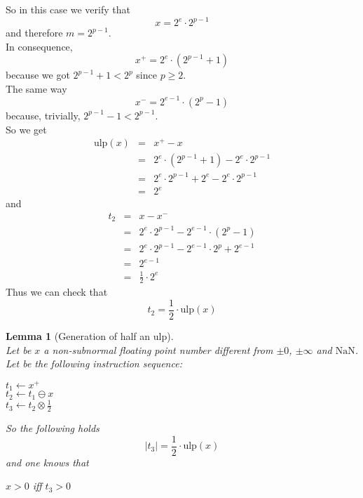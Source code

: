 \documentclass[a4paper,10pt,twoside]{article}
\newtheorem{lemma}[theorem]{Lemma}
\newenvironment{proof}[1][Proof]{\begin{trivlist}
\item[\hskip \labelsep {\bfseries #1}]}{\end{trivlist}}
\newcommand{\qed}{\nobreak \ifvmode \relax \else \ifdim \lastskip<1.5em \hskip-\lastskip
\hskip1.5em plus0em minus0.5em \fi \nobreak \vrule height0.75em width0.5em depth0.25em\fi}
\newcommand{\mUlp}{\ensuremath{\mathrm{ulp}}}
\newcommand{\nan}{\ensuremath{\mathrm{NaN}}}
\begin{document}
\begin{proof}
So in this case we verify that $$x=2^e \cdot 2^{p-1}$$ and therefore $m=2^{p-1}$. \\
In consequence, $$x^+ = 2^e \cdot \left(2^{p-1} + 1 \right)$$ because we got
$2^{p-1} + 1 < 2^p$ since $p \geq 2$. \\
The same way $$x^- = 2^{e-1} \cdot \left(2^p - 1 \right)$$ because, trivially, $2^{p-1} - 1 < 2^{p-1}$.\\
So we get
\begin{eqnarray*}
\mUlp \left( x \right) & = & x^+ - x \\
& = & 2^e \cdot \left( 2^{p-1} + 1 \right) - 2^e \cdot 2^{p-1} \\
& = & 2^e \cdot 2^{p-1} + 2^e - 2^e \cdot 2^{p-1} \\
& = & 2^e
\end{eqnarray*}
and
\begin{eqnarray*}
t_2 & = & x - x^- \\
& = & 2^e \cdot 2^{p-1} - 2^{e-1} \cdot \left( 2^p - 1 \right) \\
& = & 2^e \cdot 2^{p-1} - 2^{e-1} \cdot 2^p + 2^{e-1} \\
& = & 2^{e-1} \\
& = & \frac{1}{2} \cdot 2^e
\end{eqnarray*}
Thus we can check that
$$t_2 = \frac{1}{2} \cdot \mUlp \left( x \right)$$ \qed
\end{proof}
\begin{lemma}[Generation of half an $\mUlp$] \label{genmiulp} ~\\
Let be $x$ a non-subnormal floating point number different from $\pm 0$, $\pm\infty$ and $\nan$.\\
Let be the following instruction sequence:
\begin{center}
$t_1 \gets x^+$ \\
$t_2 \gets t_1 \ominus x$ \\
$t_3 \gets t_2 \otimes \frac{1}{2}$ 
\end{center}
So the following holds 
$$\left \vert t_3 \right \vert = \frac{1}{2} \cdot \mUlp \left( x \right)$$
and one knows that
\begin{center}
$x > 0$ iff $t_3 > 0$
\end{center}
\end{lemma}
\end{document}
